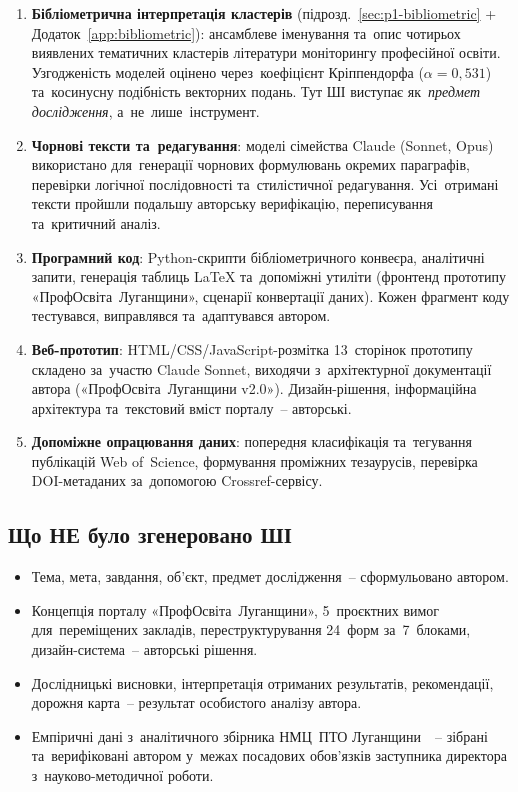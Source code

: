 \begin{enumerate}
    \item \textbf{Бібліометрична інтерпретація кластерів} (підрозд.~\ref{sec:p1-bibliometric} + Додаток~\ref{app:bibliometric}): ансамблеве іменування та~опис чотирьох виявлених тематичних кластерів літератури моніторингу професійної освіти. Узгодженість моделей оцінено через~коефіцієнт Кріппендорфа ($\alpha=0{,}531$) та~косинусну подібність векторних подань. Тут ШІ виступає як~\emph{предмет дослідження}, а~не~лише~інструмент.
    \item \textbf{Чорнові тексти та~редагування}: моделі сімейства Claude (Sonnet, Opus) використано для~генерації чорнових формулювань окремих параграфів, перевірки логічної послідовності та~стилістичної редагування. Усі~отримані тексти пройшли подальшу авторську верифікацію, переписування та~критичний аналіз.
    \item \textbf{Програмний код}: Python-скрипти бібліометричного конвеєра, аналітичні запити, генерація таблиць LaTeX та~допоміжні утиліти (фронтенд прототипу «ПрофОсвіта~Луганщини», сценарії конвертації даних). Кожен фрагмент коду тестувався, виправлявся та~адаптувався автором.
    \item \textbf{Веб-прототип}: HTML/CSS/JavaScript-розмітка 13~сторінок прототипу складено за~участю Claude Sonnet, виходячи з~архітектурної документації автора («ПрофОсвіта~Луганщини v2.0»). Дизайн-рішення, інформаційна архітектура та~текстовий вміст порталу~-- авторські.
    \item \textbf{Допоміжне опрацювання даних}: попередня класифікація та~тегування публікацій Web of~Science, формування проміжних тезаурусів, перевірка DOI-метаданих за~допомогою Crossref-сервісу.
\end{enumerate}

\subsection*{Що НЕ було згенеровано ШІ}

\begin{itemize}
    \item Тема, мета, завдання, об'єкт, предмет дослідження~-- сформульовано автором.
    \item Концепція порталу «ПрофОсвіта~Луганщини», 5~проєктних вимог для~переміщених закладів, переструктурування 24~форм за~7~блоками, дизайн-система~-- авторські рішення.
    \item Дослідницькі висновки, інтерпретація отриманих результатів, рекомендації, дорожня карта~-- результат особистого аналізу автора.
    \item Емпіричні дані з~аналітичного збірника НМЦ~ПТО Луганщини~\cite{NMTsPTO2025}~-- зібрані та~верифіковані автором у~межах посадових обов'язків заступника директора з~науково-методичної роботи.
\end{itemize}

